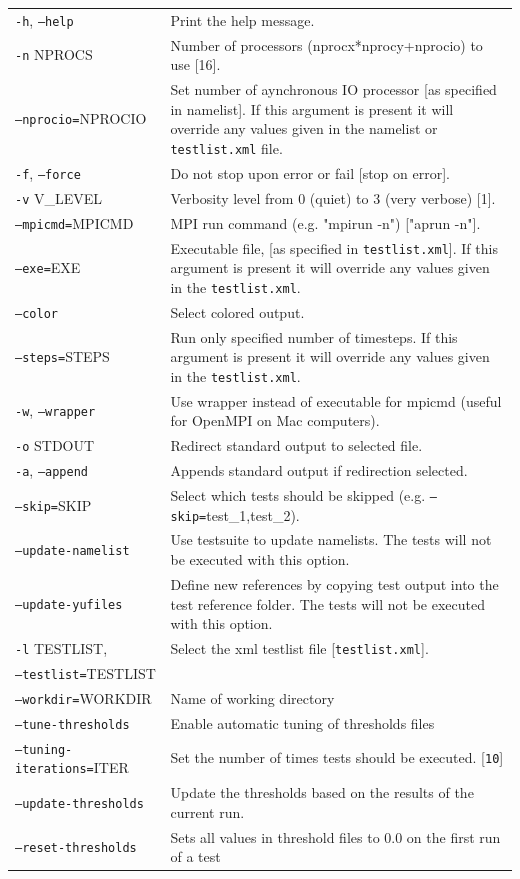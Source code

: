 \documentclass[12pt,twoside,a4paper]{report}
\begin{document}
\begin{tabular}{lp{10cm}}
\texttt{-h}, \texttt{--help} & Print the help message.\\[1.2ex]
\texttt{-n} NPROCS & Number of processors (nprocx*nprocy+nprocio) to use [16].\\[1.2ex]
\texttt{--nprocio=}NPROCIO & Set number of aynchronous IO processor [as specified in namelist]. If this argument is present it will override any values given in the namelist or \texttt{testlist.xml} file.\\[1.2ex]
\texttt{-f}, \texttt{--force} & Do not stop upon error or fail [stop on error].\\[1.2ex]
\texttt{-v} V\_LEVEL & Verbosity level from 0 (quiet) to 3 (very verbose) [1].\\[1.2ex]
\texttt{--mpicmd=}MPICMD & MPI run command (e.g. "mpirun -n") ["aprun -n"].\\[1.2ex]
\texttt{--exe=}EXE & Executable file, [as specified in \texttt{testlist.xml}]. If this argument is present it will override any values given in the \texttt{testlist.xml}.\\[1.2ex]
\texttt{--color} & Select colored output.\\[1.2ex]
\texttt{--steps=}STEPS & Run only specified number of timesteps. If this argument is present it will override any values given in the \texttt{testlist.xml}.\\[1.2ex]
\texttt{-w}, \texttt{--wrapper} & Use wrapper instead of executable for mpicmd (useful for OpenMPI on Mac computers).\\[1.2ex]
\texttt{-o} STDOUT & Redirect standard output to selected file.\\[1.2ex]
\texttt{-a}, \texttt{--append} & Appends standard output if redirection selected.\\[1.2ex]
\texttt{--skip=}SKIP & Select which tests should be skipped (e.g. \texttt{--skip=}test\_1,test\_2).\\[1.2ex]
\texttt{--update-namelist} & Use testsuite to update namelists. The tests will not be executed with this option.\\[1.2ex]
\texttt{--update-yufiles} & Define new references by copying test output into the test reference folder. The tests will not be executed with this option.\\[1.2ex] 
\texttt{-l} TESTLIST, & Select the xml testlist file [\texttt{testlist.xml}].\\
\texttt{--testlist=}TESTLIST & \\[1.2ex]
\texttt{--workdir=}WORKDIR & Name of working directory \\[1.2ex]
\texttt{--tune-thresholds} & Enable automatic tuning of thresholds files \\[1.2ex]
\texttt{--tuning-iterations=}ITER & Set the number of times tests should be executed. [\texttt{10}]\\[1.2ex]
\texttt{--update-thresholds} & Update the thresholds based on the results of the current run. \\[1.2ex]
\texttt{--reset-thresholds} & Sets all values in threshold files to 0.0 on the first run of a test\\[1.2ex]
\end{tabular}
\end{document}
